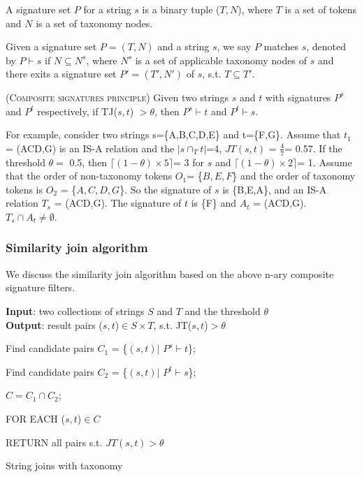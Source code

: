 A signature set $P$ for a string $s$ is a binary tuple ($T,N$), where $T$ is a set of tokens and $N$ is a set of taxonomy nodes.

\begin{definition} 
Given a signature set $P = (T,N)$ and a string $s$, we say $P$ matches $s$, denoted by $P \vdash s$ if $N \subseteq N^s$, where $N^s$ is a set of applicable taxonomy nodes of $s$ and  there exits a signature set $P' = (T',N')$ of $s$, s.t. $T \subseteq T'$.
\end{definition}


\begin{lem} (\textsc{Composite signatures principle})  Given two strings $s$ and $t$ with signatures $P^s$ and $P^t$ respectively, if TJ($s, t$) $> \theta$, then $P^s \vdash t$ and $P^t \vdash s$.

\end{lem}

For example, consider two strings s=\{A,B,C,D,E\} and t=\{F,G\}. Assume that $t_1$ = (ACD,G) is an IS-A relation and the $|s \cap_T t| $=4, $JT(s,t)$ = $\frac{4}{7}$= 0.57.
If the threshold $\theta =$ 0.5, then  $\lceil (1-\theta) \times 5 \rceil$= 3 for $s$ and $\lceil (1-\theta) \times 2 \rceil$= 1. Assume that the order of non-taxonomy tokens $O_1$= \{$B, E, F$\} and the order of taxonomy tokens is $O_2$ = \{$A, C, D, G$\}. So the signature of $s$ is \{B,E,A\}, and an IS-A relation $T_s$ = (ACD,G). The signature of $t$ is \{F\} and $A_t$ = (ACD,G). $ T_s \cap A_t \neq \emptyset$.

\subsubsection{Similarity join algorithm}

We discuss the similarity join algorithm based on the above n-ary composite signature filters.


\begin{algorithm}
{\bf Input}:  two collections of strings $S$ and $T$ and the threshold $\theta$ \\
{\bf Output}: result pairs ($s,t$)$\in S \times T$, s.t. JT($s,t$)$> \theta$
\begin{compactenum}[(1)]
\item Find candidate pairs $C_1$ = \{$(s,t) |$  $P^s \vdash t$\};
\item Find candidate pairs $C_2$ = \{$(s,t) |$  $P^t \vdash s$\};
\item  $C= C_1 \cap C_2$;
\item FOR EACH ($s,t$)$\in C$
\item RETURN all pairs s.t. $JT(s,t) > \theta$
\end{compactenum}
\caption{String joins with taxonomy}
\label{alg:exactjoin}
\end{algorithm}

